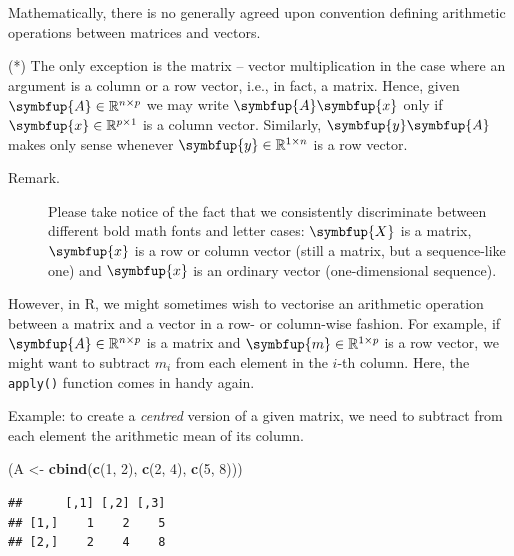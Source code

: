 \documentclass[10pt,b5paper,krantz1]{krantz}
\newenvironment{Shaded}{\begin{snugshade}}{\end{snugshade}}
\newcommand{\DecValTok}[1]{\textcolor[rgb]{0.06,0.06,0.06}{#1}}
\newcommand{\KeywordTok}[1]{\textcolor[rgb]{0.27,0.27,0.27}{\textbf{#1}}}
\newcommand{\NormalTok}[1]{#1}
\newcommand{\StringTok}[1]{\textcolor[rgb]{0.5,0.5,0.5}{#1}}
\renewcommand{\mathbf}[1]{\symbfup{#1}}
\renewcommand{\boldsymbol}[1]{\symbfup{#1}}
\renewenvironment{quote}{\begin{VF}}{\end{VF}}
\begin{document}
Mathematically, there is no generally agreed upon
convention defining arithmetic operations between matrices and vectors.

\begin{quote}
(*) The only exception is the matrix -- vector multiplication in the case
where an argument is a column or a row vector, i.e., in fact, a matrix.
Hence, given \(\mathbf{A}\in\mathbb{R}^{n\times p}\) we may write
\(\mathbf{A}\mathbf{x}\)
only if \(\mathbf{x}\in\mathbb{R}^{p\times 1}\) is a column vector.
Similarly, \(\mathbf{y}\mathbf{A}\) makes only sense
whenever \(\mathbf{y}\in\mathbb{R}^{1\times n}\) is a row vector.
\end{quote}

\begin{description}
\item[Remark.]
Please take notice of the fact that we consistently
discriminate between different bold math fonts and letter cases:
\(\mathbf{X}\) is a matrix, \(\mathbf{x}\) is a row or column vector
(still a matrix, but a sequence-like one)
and \(\boldsymbol{x}\) is an ordinary vector (one-dimensional sequence).
\end{description}

However, in R, we might sometimes wish to vectorise
an arithmetic operation between a matrix and a vector in a row- or column-wise
fashion.
For example, if \(\mathbf{A}\in\mathbb{R}^{n\times p}\) is a matrix
and \(\mathbf{m}\in\mathbb{R}^{1\times p}\) is a row vector,
we might want to subtract \(m_i\) from each element in the \(i\)-th column.
Here, the \texttt{apply()} function comes in handy again.

Example: to create a \emph{centred} version of a given matrix,
we need to subtract from each element the arithmetic mean of its column.

\begin{Shaded}
\begin{Highlighting}[]
\NormalTok{(A <-}\StringTok{ }\KeywordTok{cbind}\NormalTok{(}\KeywordTok{c}\NormalTok{(}\DecValTok{1}\NormalTok{, }\DecValTok{2}\NormalTok{), }\KeywordTok{c}\NormalTok{(}\DecValTok{2}\NormalTok{, }\DecValTok{4}\NormalTok{), }\KeywordTok{c}\NormalTok{(}\DecValTok{5}\NormalTok{, }\DecValTok{8}\NormalTok{)))}
\end{Highlighting}
\end{Shaded}

\begin{verbatim}
##      [,1] [,2] [,3]
## [1,]    1    2    5
## [2,]    2    4    8
\end{verbatim}
\end{document}
